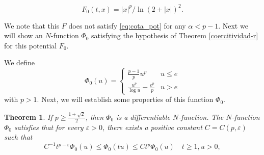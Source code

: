 \documentclass[twoside]{article}
\newtheorem{thm}{Theorem}[section]
\theoremstyle{remark}
\renewcommand{\leq}{\leqslant}
\renewcommand{\geq}{\geqslant}
\begin{document}
 \[F_0(t,x)=|x|^p/\ln(2+|x|)^2.\]

 We note that this $F$ does not satisfy \eqref{eq:cota_pot} for any $\alpha<p-1$.  
Next we will show  an $N$-function $\Phi_0$ satisfying the hypothesis of Theorem \ref{coercitividad-r} for this potential $F_0$.


We define
\[\Phi_0(u)=
\left\{
\begin{array}{ll}
\frac{p-1}{p}u^p&u\leq e
\\
\frac{u^p}{\log u}-\frac{e^p}{p}&u>e
\end{array}
\right.\]
with $p>1$. Next, we will establish some properties of this function $\Phi_0$.

\begin{thm}
If $p\geq \frac{1+\sqrt 2}{2}$, then $\Phi_0$ is a differentiable $N$-function. 
The $N$-function $\Phi_0$ satisfies that for every $\varepsilon>0$, there exists a positive constant $C=C(p,\varepsilon)$  such that
\begin{equation}\label{cota-sup-indices}
C^{-1}t^{p-\varepsilon}\Phi_0(u)\leq \Phi_0(tu) \leq Ct^p\Phi_0(u)\quad t\geq 1, u>0,
\end{equation}

\end{thm}
\end{document}
